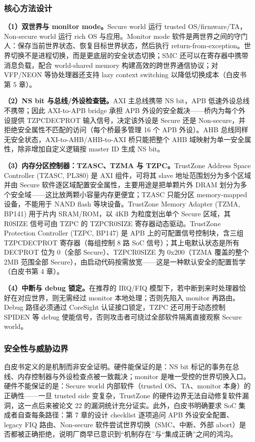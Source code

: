 \documentclass[11pt]{ctexart}
\begin{document}
\subsubsection{核心方法设计}
\noindent\textbf{（1）双世界与 monitor mode。}Secure world 运行 trusted OS/firmware/TA，Non-secure world 运行 rich OS 与应用。Monitor mode 软件是两世界之间的守门人：保存当前世界状态、恢复目标世界状态，然后执行 return-from-exception。世界切换不是进程切换，而是更底层的安全状态切换；SMC 还可以在寄存器中携带消息负载，配合 world-shared memory 构建高效的跨世界通信协议；对 VFP/NEON 等协处理器还支持 lazy context switching 以降低切换成本（白皮书第 5 章）。\par
\noindent\textbf{（2）NS bit 与总线/外设检查链。}AXI 主总线携带 NS bit，APB 低速外设总线不携带；因此 AXI-to-APB bridge 承担 APB 外设的安全裁决——桥内为每个外设提供 TZPCDECPROT 输入信号，决定该外设是 Secure 还是 Non-secure，并拒绝安全属性不匹配的访问（每个桥最多管理 16 个 APB 外设）。AHB 总线同样无安全状态，AXI-to-AHB/AHB-to-AXI 桥只能把整个 AHB 域映射为单一安全属性，除非增加自定义逻辑按 master ID 生成 NS bit。\par
\noindent\textbf{（3）内存分区控制器：TZASC、TZMA 与 TZPC。}TrustZone Address Space Controller (TZASC, PL380) 是 AXI 组件，可将其 slave 地址范围划分为多个区域并由 Secure 软件逐区域配置安全属性，主要用途是把单颗片外 DRAM 划分为多个安全域——这比放两颗小容量内存更便宜；TZASC 只能分区 memory-mapped 设备，不能用于 NAND flash 等块设备。TrustZone Memory Adapter (TZMA, BP141) 用于片内 SRAM/ROM，以 4KB 为粒度划出单个 Secure 区域，其 R0SIZE 信号可由 TZPC 的 TZPCR0SIZE 寄存器动态驱动。TrustZone Protection Controller (TZPC, BP147) 是 APB 上的可配置信号控制块，含三组 TZPCDECPROT 寄存器（每组控制 8 路 SoC 信号）；其上电默认状态是所有 DECPROT 位为 0（全部 Secure）、TZPCR0SIZE 为 0x200（TZMA 覆盖的整个 2MB 范围全部 Secure），由启动代码按需放宽——这是一种默认安全的配置哲学（白皮书第 4 章）。\par
\noindent\textbf{（4）中断与 debug 锁定。}在推荐的 IRQ/FIQ 模型下，若中断到来时处理器恰好在对应世界，则无需经过 monitor 本地处理；否则先陷入 monitor 再路由。Debug 路径必须通过 CoreSight 认证接口锁定，TZPC 还可用于动态控制 SPIDEN 等 debug 使能信号，否则攻击者可绕过全部软件隔离直接观察 Secure world。\par
\subsubsection{安全性与威胁边界}
白皮书定义的是机制而非安全证明。硬件能保证的是：NS bit 标记的事务在总线、内存控制器与外设检查点被一致裁决；monitor 是唯一受控的世界切换入口。硬件不能保证的是：Secure world 内部软件（trusted OS、TA、monitor 本身）的正确性——一旦 trusted side 变复杂，TrustZone 的硬件边界无法自动修复软件漏洞，这一点后来被论文 22 的漏洞统计充分证实。此外，白皮书明确要求 SoC 集成者自查每条路径：第 7 章的设计 checklist 逐项追问 APB 外设安全配置、legacy FIQ 路由、Non-secure 软件尝试世界切换（SMC、中断、外部 abort）是否都被正确拒绝，说明厂商早已意识到``机制存在''与``集成正确''之间的鸿沟。\par
\end{document}
